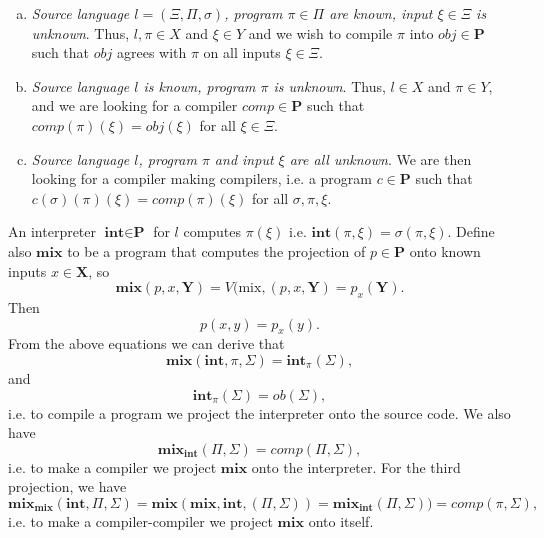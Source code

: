 \documentclass[11pt]{article}
\theoremstyle{definition}
\newcommand\tab[1][1cm]{\hspace*{#1}}
\begin{document}
\begin{enumerate}[(a)]
    \item \textit{Source language $l = (\Xi, \Pi, \sigma)$, program $\pi\in \Pi$ are known, input $\xi \in \Xi$ is unknown}. Thus, $l, \pi \in X$ and $\xi \in Y$ and we wish to compile $\pi$ into $obj \in \textbf{P}$ such that $obj$ agrees with $\pi$ on all inputs $\xi \in \Xi$.
    \item \textit{Source language $l$ is known, program $\pi$ is unknown}. Thus, $l\in X$ and $\pi \in Y$, and we are looking for a compiler $comp \in \textbf{P}$ such that $comp(\pi)(\xi) = obj (\xi)$ for all $\xi \in \Xi$.
    \item \textit{Source language $l$, program $\pi$ and input $\xi$ are all unknown}. We are then looking for a compiler making compilers, i.e. a program $c \in \textbf{P}$ such that $c(\sigma)(\pi)(\xi) = comp(\pi)(\xi)$ for all $\sigma, \pi, \xi$.
\end{enumerate}
 An interpreter $\textbf{int}\in \textbf{P}$ for $l$ computes $\pi(\xi)$ i.e. $\textbf{int}(\pi, \xi) = \sigma(\pi, \xi)$.
\tab Define also $\textbf{mix}$ to be a program that computes the projection of $p\in \textbf{P}$ onto known inputs $x\in \textbf{X}$, so $$\textbf{mix}(p, x, \textbf{Y}) = V(\text{mix}, (p, x, \textbf{Y}) = p_x (\textbf{Y}).$$
 \tab Then $$p(x, y) = p_x(y).$$ From the above equations we can derive that 
 $$\textbf{mix}(\textbf{int}, \pi, \Sigma) = \textbf{int}_{\pi} (\Sigma),$$ and $$\textbf{int}_{\pi}(\Sigma) = ob(\Sigma),$$ i.e. to compile a program we project the interpreter onto the source code.
 \tab We also have $$\textbf{mix}_{\textbf{int}}(\Pi, \Sigma) = comp(\Pi, \Sigma),$$ i.e. to make a compiler we project $\textbf{mix}$ onto the interpreter.
 \tab For the third projection, we have $$\textbf{mix}_{\textbf{mix}}(\textbf{int}, \Pi, \Sigma) = \textbf{mix}(\textbf{mix}, \textbf{int}, (\Pi, \Sigma)) = \textbf{mix}_{\textbf{int}}(\Pi, \Sigma)) = comp(\pi, \Sigma),$$
 i.e. to make a compiler-compiler we project $\textbf{mix}$ onto itself.
\end{document}
